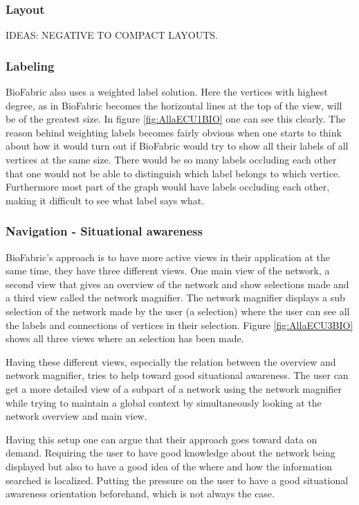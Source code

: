 \documentclass[a4paper,11pt]{kth-mag}
\begin{document}
\subsubsection{Layout}
IDEAS: NEGATIVE TO COMPACT LAYOUTS.
\subsubsection{Labeling}
BioFabric also uses a weighted label solution. Here the vertices with highest degree, as in BioFabric becomes the horizontal lines at the top of the view, will be of the greatest size.  
In figure \ref{fig:AllaECU1BIO} one can see this clearly. The reason behind weighting labels becomes fairly obvious when one
starts to think about how it would turn out if BioFabric would try to show all their labels of all vertices at the same 
size. There would be so many labels occluding each other that one would not be able to distinguish which label
belongs to which vertice. Furthermore most part of the graph would have labels occluding each other, making it
difficult to see what label says what.
\subsubsection{Navigation - Situational awareness}
BioFabric's approach is to have more active views in their application at the same time, they have three different views. One main 
view of the network, a second view that gives an overview of the network and show selections made and a third view called the network magnifier. The network 
magnifier displays a sub selection of the network made by the user (a selection) where the user can see all the labels and
connections of vertices in their selection. Figure \ref{fig:AllaECU3BIO} shows all three views where an selection has been made. 

Having these different views, especially the relation between the overview and  network magnifier, tries to 
help toward good situational awareness. The user can get a more detailed view of a subpart of a network using the network magnifier while trying to maintain a global 
context by simultaneously looking at the network overview and main view. 

Having this setup one can argue that their approach goes toward data on demand. Requiring the user 
to have good knowledge about the network being displayed but also to have a good idea of the where and how the
information searched is localized. Putting the pressure on the user to have a good situational 
awareness orientation beforehand, which is not always the case.
 
\end{document}
